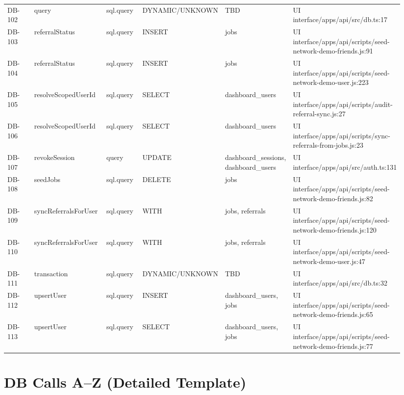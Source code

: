 \documentclass[11pt]{article}
\begin{document}
\begin{longtable}{p{0.10\linewidth}p{0.19\linewidth}p{0.10\linewidth}p{0.18\linewidth}p{0.16\linewidth}p{0.21\linewidth}}
DB-102 & query & sql.query & DYNAMIC/UNKNOWN & TBD & UI interface/apps/api/src/db.ts:17 \\
DB-103 & referralStatus & sql.query & INSERT & jobs & UI interface/apps/api/scripts/seed-network-demo-friends.js:91 \\
DB-104 & referralStatus & sql.query & INSERT & jobs & UI interface/apps/api/scripts/seed-network-demo-user.js:223 \\
DB-105 & resolveScopedUserId & sql.query & SELECT & dashboard\_users & UI interface/apps/api/scripts/audit-referral-sync.js:27 \\
DB-106 & resolveScopedUserId & sql.query & SELECT & dashboard\_users & UI interface/apps/api/scripts/sync-referrals-from-jobs.js:23 \\
DB-107 & revokeSession & query & UPDATE & dashboard\_sessions, dashboard\_users & UI interface/apps/api/src/auth.ts:131 \\
DB-108 & seedJobs & sql.query & DELETE & jobs & UI interface/apps/api/scripts/seed-network-demo-friends.js:82 \\
DB-109 & syncReferralsForUser & sql.query & WITH & jobs, referrals & UI interface/apps/api/scripts/seed-network-demo-friends.js:120 \\
DB-110 & syncReferralsForUser & sql.query & WITH & jobs, referrals & UI interface/apps/api/scripts/seed-network-demo-user.js:47 \\
DB-111 & transaction & sql.query & DYNAMIC/UNKNOWN & TBD & UI interface/apps/api/src/db.ts:32 \\
DB-112 & upsertUser & sql.query & INSERT & dashboard\_users, jobs & UI interface/apps/api/scripts/seed-network-demo-friends.js:65 \\
DB-113 & upsertUser & sql.query & SELECT & dashboard\_users, jobs & UI interface/apps/api/scripts/seed-network-demo-friends.js:77 \\
\bottomrule
\end{longtable}

\section{DB Calls A--Z (Detailed Template)}
\end{document}
